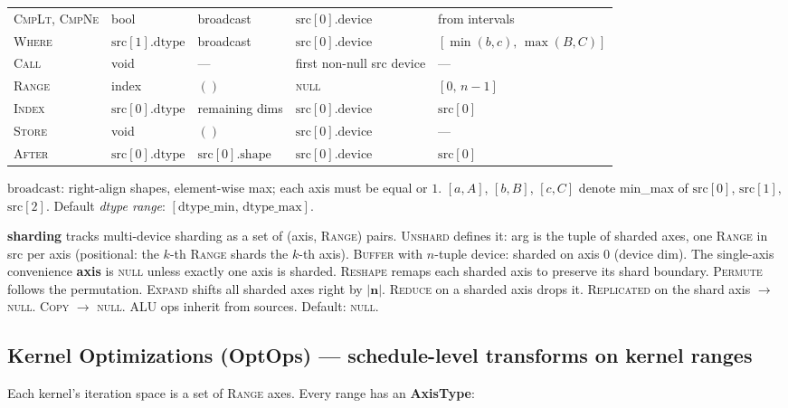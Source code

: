 \documentclass[10pt,letterpaper]{article}
\newcommand{\op}[1]{\textsc{#1}}
\begin{document}
\begin{tabular}{@{}l l l l l@{}}
\op{CmpLt}, \op{CmpNe} & bool & broadcast & $\mathrm{src}[0].\mathrm{device}$ & from intervals \\
\op{Where} & $\mathrm{src}[1].\mathrm{dtype}$ & broadcast & $\mathrm{src}[0].\mathrm{device}$ & $[\min(b,c),\, \max(B,C)]$ \\[3pt]
\op{Call} & void & --- & first non-null src device & --- \\
\op{Range} & index & $()$ & \textsc{null} & $[0,\, n{-}1]$ \\
\op{Index} & $\mathrm{src}[0].\mathrm{dtype}$ & remaining dims & $\mathrm{src}[0].\mathrm{device}$ & $\mathrm{src}[0]$ \\
\op{Store} & void & $()$ & $\mathrm{src}[0].\mathrm{device}$ & --- \\
\op{After} & $\mathrm{src}[0].\mathrm{dtype}$ & $\mathrm{src}[0].\mathrm{shape}$ & $\mathrm{src}[0].\mathrm{device}$ & $\mathrm{src}[0]$ \\
\bottomrule
\end{tabular}

\smallskip
$\mathrm{broadcast}$: right-align shapes, element-wise max; each axis must be equal or $1$.
$[a,A]$, $[b,B]$, $[c,C]$ denote min\_max of $\mathrm{src}[0]$, $\mathrm{src}[1]$, $\mathrm{src}[2]$.
Default \emph{dtype range}: $[\mathrm{dtype\_min},\, \mathrm{dtype\_max}]$.

\medskip
\textbf{sharding} tracks multi-device sharding as a set of (axis, \op{Range}) pairs. \op{Unshard} defines it: arg is the tuple of sharded axes, one \op{Range} in src per axis (positional: the $k$-th \op{Range} shards the $k$-th axis). \op{Buffer} with $n$-tuple device: sharded on axis $0$ (device dim). The single-axis convenience \textbf{axis} is \textsc{null} unless exactly one axis is sharded.
\op{Reshape} remaps each sharded axis to preserve its shard boundary. \op{Permute} follows the permutation. \op{Expand} shifts all sharded axes right by $|\mathbf{n}|$.
\op{Reduce} on a sharded axis drops it. \op{Replicated} on the shard axis $\to$ \textsc{null}. \op{Copy} $\to$ \textsc{null}. ALU ops inherit from sources. Default: \textsc{null}.

\subsection*{Kernel Optimizations (OptOps) \normalfont\small--- schedule-level transforms on kernel ranges}

Each kernel's iteration space is a set of \op{Range} axes. Every range has an \textbf{AxisType}:
\end{document}
